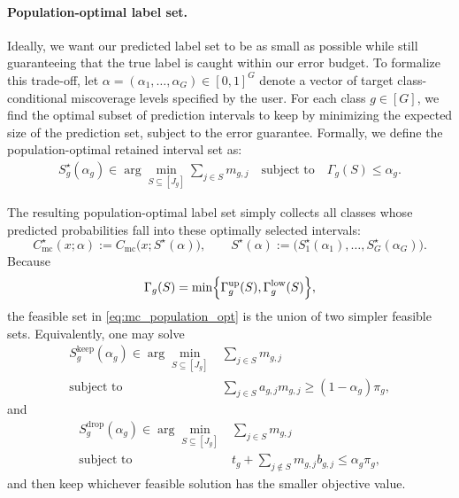 \documentclass[11pt]{article}
\theoremstyle{statplain}
\theoremstyle{statdefinition}
\newcommand{\mc}{\mathrm{mc}}
\newcommand{\0}{\mathbf{0}}
\newcommand{\numClass}{G} %
\newcommand{\iteratorClass}{g}
\begin{document}
\paragraph{Population-optimal label set.}
Ideally, we want our predicted label set to be as small as possible while still guaranteeing that the true label is caught within our error budget. To formalize this trade-off, let $\alpha = (\alpha_1, \ldots, \alpha_\numClass) \in [0,1]^\numClass$ denote a vector of target class-conditional miscoverage levels specified by the user.
For each class $\iteratorClass \in [\numClass]$, we find the optimal subset of prediction intervals to keep by minimizing the expected size of the prediction set, subject to the error guarantee. Formally, we define the population-optimal retained interval set as:
\begin{align}
S_\iteratorClass^\star(\alpha_\iteratorClass)
\in
\arg\min_{S\subseteq[J_\iteratorClass]}
\sum_{j\in S} m_{\iteratorClass,j}
\quad \text{subject to} \quad
\Gamma_{\iteratorClass}(S)\le \alpha_\iteratorClass.
\label{eq:mc_population_opt}
\end{align}

The resulting population-optimal label set simply collects all classes whose predicted probabilities fall into these optimally selected intervals:
\[
C_{\mc}^\star(x;\alpha)
:=
C_{\mc}\bigl(x;S^\star(\alpha)\bigr),
\qquad
S^\star(\alpha)
:=
\bigl(
S_1^\star(\alpha_1),\ldots,S_\numClass^\star(\alpha_\numClass)
\bigr).
\]
Because
\[
\Gamma_{\iteratorClass}(S)
=
\min\Bigl\{
\Gamma_{\iteratorClass}^{\mathrm{up}}(S),
\Gamma_{\iteratorClass}^{\mathrm{low}}(S)
\Bigr\},
\]
the feasible set in \eqref{eq:mc_population_opt} is the union of two simpler feasible sets.
Equivalently, one may solve
\begin{align}
S_\iteratorClass^{\mathrm{keep}}(\alpha_\iteratorClass)
\in
\arg\min_{S\subseteq[J_\iteratorClass]}
&\sum_{j\in S} m_{\iteratorClass,j}
\label{eq:mc_keep_problem}\\
\text{subject to}\quad
&\sum_{j\in S} a_{\iteratorClass,j}m_{\iteratorClass,j}
\ge
(1-\alpha_\iteratorClass)\pi_\iteratorClass,
\nonumber
\end{align}
and
\begin{align}
S_\iteratorClass^{\mathrm{drop}}(\alpha_\iteratorClass)
\in
\arg\min_{S\subseteq[J_\iteratorClass]}
&\sum_{j\in S} m_{\iteratorClass,j}
\label{eq:mc_drop_problem}\\
\text{subject to}\quad
&t_\iteratorClass+\sum_{j\notin S} m_{\iteratorClass,j} b_{\iteratorClass,j}
\le
\alpha_\iteratorClass \pi_\iteratorClass,
\nonumber
\end{align}
and then keep whichever feasible solution has the smaller objective value.
\end{document}
